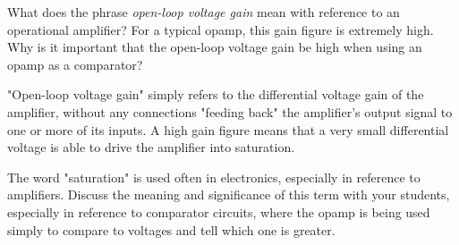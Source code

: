 

What does the phrase {\it open-loop voltage gain} mean with reference to an operational amplifier?  For a typical opamp, this gain figure is extremely high.  Why is it important that the open-loop voltage gain be high when using an opamp as a comparator?







"Open-loop voltage gain" simply refers to the differential voltage gain of the amplifier, without any connections "feeding back" the amplifier's output signal to one or more of its inputs.  A high gain figure means that a very small differential voltage is able to drive the amplifier into saturation.







The word "saturation" is used often in electronics, especially in reference to amplifiers.  Discuss the meaning and significance of this term with your students, especially in reference to comparator circuits, where the opamp is being used simply to compare to voltages and tell which one is greater.




